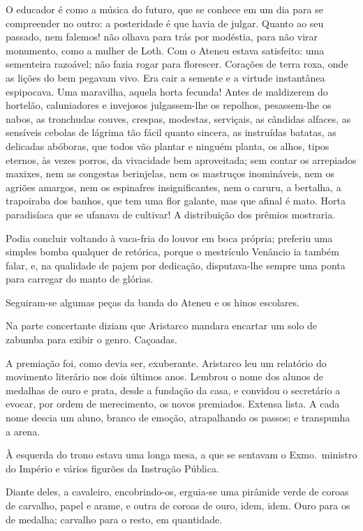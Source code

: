 O educador é como a
música do futuro, que se conhece em um dia para se compreender no
outro: a posteridade é que havia de julgar. Quanto ao seu passado, nem
falemos! não olhava para trás por modéstia, para não virar monumento,
como a mulher de Loth. Com o Ateneu estava satisfeito: uma sementeira
razoável; não fazia rogar para florescer. Corações de terra roxa, onde
as lições do bem pegavam vivo. Era cair a semente e a virtude
instantânea espipocava. Uma maravilha, aquela horta fecunda! Antes de
maldizerem do hortelão, caluniadores e invejosos julgassem{}-lhe os
repolhos, pesassem{}-lhe os nabos, as tronchudas couves, crespas,
modestas, serviçais, as cândidas alfaces, as sensíveis cebolas de
lágrima tão fácil quanto sincera, as instruídas batatas, as delicadas
abóboras, que todos vão plantar e ninguém planta, os alhos, tipos
eternos, às vezes porros, da vivacidade bem aproveitada; sem contar os
arrepiados maxixes, nem as congestas berinjelas, nem os mastruços
inomináveis, nem os agriões amargos, nem os espinafres insignificantes,
nem o caruru, a bertalha, a trapoiraba dos banhos, que tem uma flor
galante, mas que afinal é mato. Horta paradisíaca que se ufanava de
cultivar! A distribuição dos prêmios mostraria. 


Podia concluir voltando
à vaca{}-fria do louvor em boca própria; preferiu uma simples bomba
qualquer de retórica, porque o mestrículo Venâncio ia também falar, e,
na qualidade de pajem por dedicação, disputava{}-lhe sempre uma ponta
para carregar do manto de glórias. 

Seguiram{}-se algumas peças da banda do Ateneu e os hinos escolares.

Na parte concertante diziam que Aristarco mandara encartar um solo de
zabumba para exibir o genro. Caçoadas.

A premiação foi, como devia ser,
exuberante. Aristarco leu um relatório do movimento literário nos dois
últimos anos. Lembrou o nome dos alunos de medalhas de ouro e prata,
desde a fundação da casa, e convidou o secretário a evocar, por ordem
de merecimento, os novos premiados. Extensa lista. A cada nome descia
um aluno, branco de emoção, atrapalhando os passos; e transpunha a
arena. 

À esquerda do trono estava uma longa mesa, a que se sentavam o
Exmo.~ministro do Império e vários figurões da Instrução Pública.

Diante deles, a cavaleiro, encobrindo{}-os, erguia{}-se uma pirâmide
verde de coroas de carvalho, papel e arame, e outra de coroas de ouro,
idem, idem. Ouro para os de medalha; carvalho para o resto, em
quantidade. 

